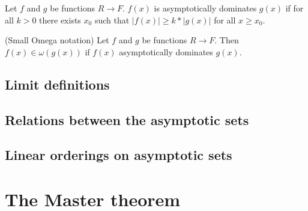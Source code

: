 \begin{definition}
\leanok
    Let $f$ and $g$ be functions $R \to F$. $f(x)$ is asymptotically dominates $g(x)$ if 
    for all $k > 0$ there exists $x_0$ such that $|f(x)| \ge k*|g(x)|$ for all $x \ge x_0$.
\end{definition}

\begin{definition}(Small Omega notation)
\leanok
    Let $f$ and $g$ be functions $R \to F$. Then $f(x) \in \omega(g(x))$ if $f(x)$ 
    asymptotically dominates $g(x)$.
\end{definition}


\subsection{Limit definitions}

\subsection{Relations between the asymptotic sets}



\subsection{Linear orderings on asymptotic sets}

\section{The Master theorem}

